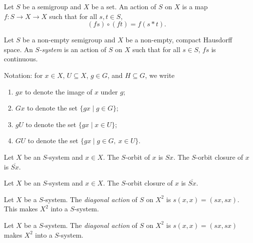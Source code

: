 \begin{definition}
\leanok{}
Let $S$ be a semigroup and $X$ be a set.  An action of $S$ on $X$ is a map $f: S \to X \to X$ such that for all $s, t \in S$,
\[(f s) \circ (f t) = f (s*t).\]
\end{definition}

\begin{definition}
\leanok{}
    Let $S$ be a non-empty semigroup and $X$ be a non-empty, compact Hausdorff space. An \emph{$S$-system} is an action of $S$ on $X$ such that for all $s \in S$, $f s$ is continuous.
\end{definition}

Notation: for $x \in X$, $U \subseteq X$, $g \in G$, and $H \subseteq G$, we write
\begin{enumerate}
    \item $gx$ to denote the image of $x$ under $g$;
    
    \item $Gx$ to denote the set $\{gx \mid g \in G\}$;

    \item $gU$ to denote the set $\{g x \mid x \in U\}$;

    \item $GU$ to denote the set $\{gx \mid g \in G, \ x \in U\}$.
\end{enumerate}

\begin{definition}[Orbit]
\leanok{}
    Let $X$ be an $S$-system and $x \in X$.  The $S$-orbit of $x$ is $Sx$.  The $S$-orbit closure of $x$ is $\overline{Sx}$.
\end{definition}

\begin{definition}
\leanok{}
    Let $X$ be an $S$-system and $x \in X$.  The $S$-orbit closure of $x$ is $\overline{Sx}$.
\end{definition}

\begin{definition}
\leanok{}
    Let $X$ be a $S$-system.  The \emph{diagonal action} of $S$ on $X^2$ is $s(x,x) = (sx,sx)$.  This makes $X^2$ into a $S$-system.
\end{definition}

\begin{definition}
\leanok{}
    Let $X$ be a $S$-system.  The \emph{diagonal action} of $S$ on $X^2$ is $s(x,x) = (sx,sx)$ makes $X^2$ into a $S$-system.
\end{definition}

